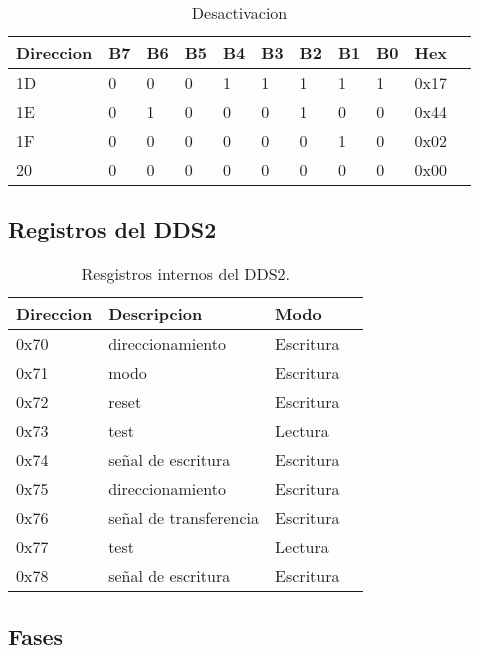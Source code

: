     \begin{table}[ht]
    \centering
    \begin{tabular}{|l|l|l|l|l|l|l|l|l|l|l|}
    \hline
    Direccion  &B7 & B6 & B5 & B4& B3 & B2& B1 & B0 &Hex\\
    \hline
    1D  &0 & 0 & 0 & 1& 1 & 1& 1 & 1 &0x17\\
    \hline
    1E  &0 & 1 & 0 & 0& 0 & 1& 0 & 0 &0x44\\
    \hline
    1F  &0 & 0 & 0 & 0& 0 & 0& 1 & 0 & 0x02\\
    \hline
    20  &0 & 0 & 0 & 0 & 0 & 0& 0 & 0&0x00 \\
    \hline
    \end{tabular}
    \caption{\label{tab:dds2_deactivate}Desactivacion}
    \end{table}
\newpage
\subsection{Registros del DDS2}
\begin{table}[ht]
    \centering
    \begin{tabular}{|l|l|l|l|}
    \hline
    Direccion  & Descripcion             & Modo      \\
    \hline
    0x70       & direccionamiento        & Escritura \\
    \hline
    0x71       & modo                    & Escritura \\
    \hline
    0x72       & reset                   & Escritura \\
    \hline
    0x73       & test                    & Lectura   \\
    \hline
    0x74       & se\~nal de escritura      & Escritura \\
    \hline
    0x75       & direccionamiento        & Escritura \\
    \hline
    0x76       & se\~nal de transferencia  & Escritura \\
    \hline
    0x77       & test                    & Lectura   \\
    \hline
    0x78       & se\~nal de escritura      & Escritura \\
    \hline
\end{tabular}
\caption{\label{tab:registros_internos_dds2}Resgistros internos del DDS2.}
\end{table}


\subsection{Fases}


